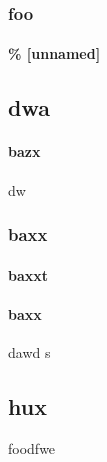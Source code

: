 \documentclass[]{article}
\begin{document}
\section{foo}


\subsection*{\% [unnamed]}



\begin{center}
\part*{dwa}





\subsection{bazx} dw





\section{baxx}



\subsection{baxxt}




\end{center}




\subsection{baxx}



dawd
s


\chapter{hux}




foodfwe
\end{document}
